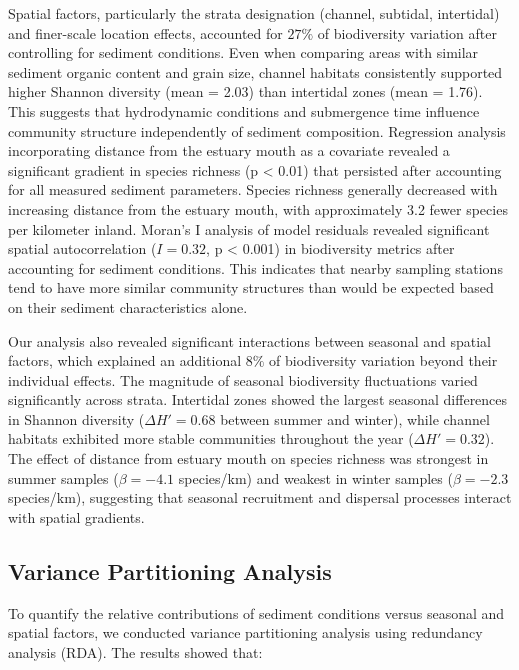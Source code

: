 \documentclass[12pt]{article}
\begin{document}
\qquad Spatial factors, particularly the strata designation (channel, subtidal, intertidal) and finer-scale location effects, accounted for $27\%$ of biodiversity variation after controlling for sediment conditions. Even when comparing areas with similar sediment organic content and grain size, channel habitats consistently supported higher Shannon diversity (mean = 2.03) than intertidal zones (mean = 1.76). This suggests that hydrodynamic conditions and submergence time influence community structure independently of sediment composition. Regression analysis incorporating distance from the estuary mouth as a covariate revealed a significant gradient in species richness (p < 0.01) that persisted after accounting for all measured sediment parameters. Species richness generally decreased with increasing distance from the estuary mouth, with approximately 3.2 fewer species per kilometer inland. Moran's I analysis of model residuals revealed significant spatial autocorrelation ($I = 0.32$, p < 0.001) in biodiversity metrics after accounting for sediment conditions. This indicates that nearby sampling stations tend to have more similar community structures than would be expected based on their sediment characteristics alone.

\qquad Our analysis also revealed significant interactions between seasonal and spatial factors, which explained an additional $8\%$ of biodiversity variation beyond their individual effects. The magnitude of seasonal biodiversity fluctuations varied significantly across strata. Intertidal zones showed the largest seasonal differences in Shannon diversity ($\Delta H' = 0.68$ between summer and winter), while channel habitats exhibited more stable communities throughout the year ($\Delta H' = 0.32$). The effect of distance from estuary mouth on species richness was strongest in summer samples ($\beta = -4.1$ species/km) and weakest in winter samples ($\beta = -2.3$ species/km), suggesting that seasonal recruitment and dispersal processes interact with spatial gradients.

\subsection{Variance Partitioning Analysis}

To quantify the relative contributions of sediment conditions versus seasonal and spatial factors, we conducted variance partitioning analysis using redundancy analysis (RDA). The results showed that:
\end{document}
